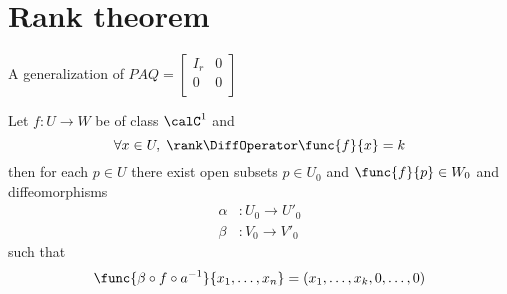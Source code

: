 \section{Rank theorem}
A generalization of \(PAQ = \begin{bmatrix}
    I_r & 0 \\
    0   & 0 \\
\end{bmatrix}\)
\begin{theorem}
    Let \(f: U \to W\) be of class \(\calC^1\) and
    \begin{equation*}
        \forall x \in U, \; \rank \DiffOperator \func{f}{x} = k
    \end{equation*}
    then for each \(p \in U\) there exist open subsets \(p \in U_0\) and \(\func{f}{p} \in W_0\) and diffeomorphisms
    \begin{align*}
        \alpha & : U_0 \to U'_0 \\
        \beta  & : V_0 \to V'_0
    \end{align*}
    such that
    \begin{equation*}
        \func{ \beta \circ f \circ a^{-1} }{x_1, \dots, x_n} = (x_1, \dots , x_k, 0 , \dots, 0)
    \end{equation*}
\end{theorem}

